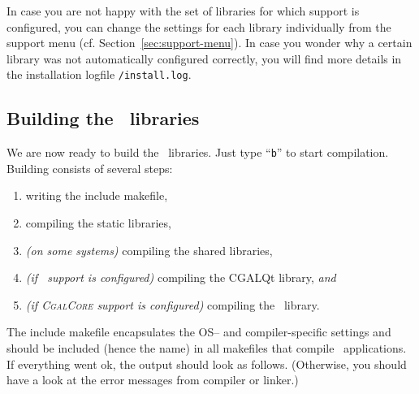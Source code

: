 In case you are not happy with the set of libraries for which support
is configured, you can change the settings for each library
individually from the support menu (cf.
Section~\ref{sec:support-menu}). In case you wonder why a certain
library was not automatically configured correctly, you will find more
details in the installation logfile \texttt{\cgaldir/install.log}.

\subsection{Building the \cgal\ libraries}\label{sec:build-the-libs}

We are now ready to build the \cgal\ libraries.  Just type ``{\tt b}''
to start compilation. Building consists of several steps:
\begin{enumerate}
\item writing the include makefile,
\item compiling the static libraries, 
\item \textit{(on some systems)} compiling the shared libraries,
\item \textit{(if \qt\ support is configured)} compiling the CGALQt
  library, \textit{and}
\item \textit{(if \textsc{CgalCore} support is configured)} compiling
  the \core\ library.
\end{enumerate}
The include makefile encapsulates the OS-- and
compiler-specific settings and should be included (hence the name) in
all makefiles that compile \cgal\ applications. If everything went ok,
the output should look as follows. (Otherwise, you should have a look
at the error messages from compiler or linker.)

